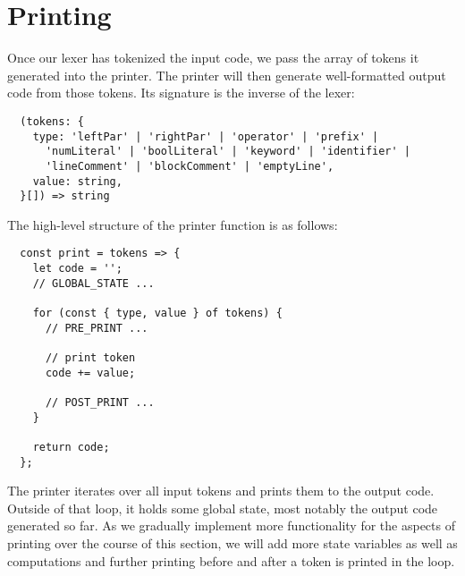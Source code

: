 \section{Printing}
Once our lexer has tokenized the input code,
we pass the array of tokens it generated into the printer.
The printer will then generate well-formatted output code from those tokens.
Its signature is the inverse of the lexer:
\begin{verbatim}
  (tokens: {
    type: 'leftPar' | 'rightPar' | 'operator' | 'prefix' |
      'numLiteral' | 'boolLiteral' | 'keyword' | 'identifier' |
      'lineComment' | 'blockComment' | 'emptyLine',
    value: string,
  }[]) => string
\end{verbatim}

The high-level structure of the printer function is as follows:
\begin{verbatim}
  const print = tokens => {
    let code = '';
    // GLOBAL_STATE ...

    for (const { type, value } of tokens) {
      // PRE_PRINT ...

      // print token
      code += value;

      // POST_PRINT ...
    }

    return code;
  };
\end{verbatim}
The printer iterates over all input tokens
and prints them to the output code.
Outside of that loop, it holds some global state,
most notably the output code generated so far.
As we gradually implement
more functionality for the aspects of printing
over the course of this section,
we will add more state variables
as well as computations and further printing
before and after a token is printed in the loop.








